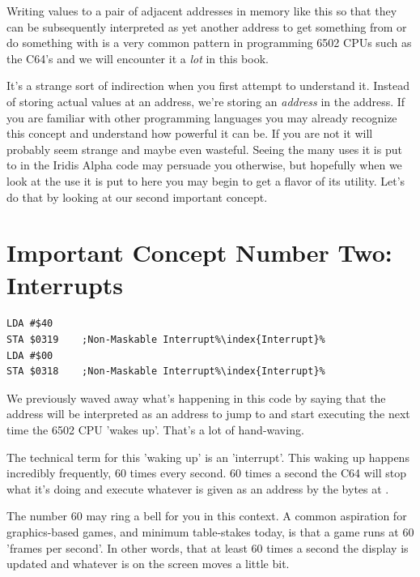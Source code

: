 Writing values to a pair of adjacent addresses in memory like this so that they can
be subsequently interpreted as yet another address to get something from or do something with is a very common
pattern in programming 6502 CPUs such as the C64's and we will encounter it a \textit{lot} in this book.

It's a strange sort of indirection when you first attempt to understand it. Instead of storing actual values
at an address, we're storing an \textit{address} in the address. If you are familiar with other programming languages
you may already recognize this concept and understand how powerful it can be. If you are not it will probably
seem strange and maybe even wasteful. Seeing the many uses it is put to in the Iridis Alpha code may persuade
you otherwise, but hopefully when we look at the use it is put to here you may begin to get a flavor of its
utility. Let's do that by looking at our second important concept.

\section{Important Concept Number Two: Interrupts}
\begin{lstlisting}[caption=It's an interrupt\index{interrupt}. And it's non-maskable.,escapechar=\%]
LDA #$40
STA $0319    ;Non-Maskable Interrupt%\index{Interrupt}%
LDA #$00
STA $0318    ;Non-Maskable Interrupt%\index{Interrupt}%
\end{lstlisting}

We previously waved away what's happening in this code by saying that the address  will be interpreted
as an address to jump to and start executing the next time the 6502 CPU 'wakes up'. That's a lot of hand-waving.

The technical term for this 'waking up' is an 'interrupt'. This waking up happens incredibly frequently, 60 times every second.
60 times a second the C64 will stop what it's doing and execute whatever is given as an address by the bytes at .

The number 60 may ring a bell for you in this context. A common aspiration for graphics-based games, and minimum table-stakes today,
is that a game runs at 60 'frames per second'. In other words, that at least 60 times a second the display is updated and whatever
is on the screen moves a little bit.

